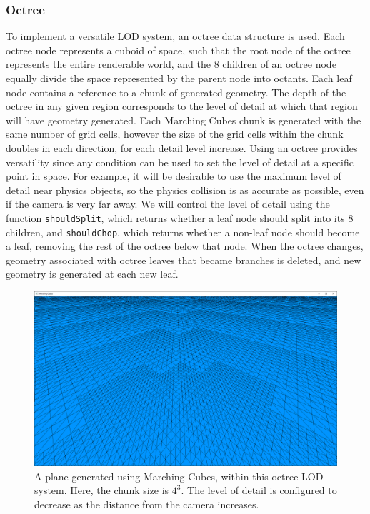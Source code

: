 \documentclass[11pt]{article}
\begin{document}
\subsubsection{Octree}
\label{section:octree}
To implement a versatile LOD system, an octree data structure is used. Each octree node represents a cuboid of space, such that the root node of the octree represents the entire renderable world, and the 8 children of an octree node equally divide the space represented by the parent node into octants. Each leaf node contains a reference to a chunk of generated geometry. The depth of the octree in any given region corresponds to the level of detail at which that region will have geometry generated. Each Marching Cubes chunk is generated with the same number of grid cells, however the size of the grid cells within the chunk doubles in each direction, for each detail level increase. Using an octree provides versatility since any condition can be used to set the level of detail at a specific point in space. For example, it will be desirable to use the maximum level of detail near physics objects, so the physics collision is as accurate as possible, even if the camera is very far away. We will control the level of detail using the function \texttt{shouldSplit}, which returns whether a leaf node should split into its 8 children, and \texttt{shouldChop}, which returns whether a non-leaf node should become a leaf, removing the rest of the octree below that node. When the octree changes, geometry associated with octree leaves that became branches is deleted, and new geometry is generated at each new leaf.

\begin{figure}[H]
  \includegraphics[width=\textwidth]{octree_plane.png}
  \caption{A plane generated using Marching Cubes, within this octree LOD system. Here, the chunk size is $4^3$. The level of detail is configured to decrease as the distance from the camera increases.}
\end{figure}
\end{document}
